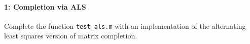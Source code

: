 \documentclass[12pt, leqno]{article} %
\begin{document}

\paragraph*{1: Completion via ALS}
Complete the function {\tt test\_als.m} with an implementation of
the alternating least squares version of matrix completion.
\end{document}
